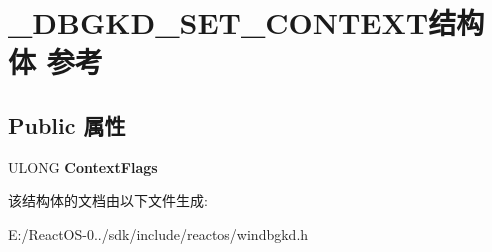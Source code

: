 \hypertarget{struct___d_b_g_k_d___s_e_t___c_o_n_t_e_x_t}{}\section{\+\_\+\+D\+B\+G\+K\+D\+\_\+\+S\+E\+T\+\_\+\+C\+O\+N\+T\+E\+X\+T结构体 参考}
\label{struct___d_b_g_k_d___s_e_t___c_o_n_t_e_x_t}
\subsection*{Public 属性}
\begin{DoxyCompactItemize}
\item 
\mbox{\label{struct___d_b_g_k_d___s_e_t___c_o_n_t_e_x_t_a2df52e619f3160372d61c656dae2466e}} 
U\+L\+O\+NG {\bfseries Context\+Flags}
\end{DoxyCompactItemize}


该结构体的文档由以下文件生成\+:\begin{DoxyCompactItemize}
\item 
E\+:/\+React\+O\+S-\/0../sdk/include/reactos/windbgkd.\+h\end{DoxyCompactItemize}
